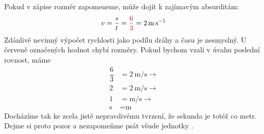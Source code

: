\begin{mdframed}[style=mdexam]
  \begin{example}\label{fyz:exam023}
    Pokud v zápise rozměr zapomeneme, může dojít k zajímavým absurditám:
    \begin{equation*}
      v = \dfrac{s}{t} = \textcolor{red}{\dfrac{6}{3}} = \SI{2}{\m\per\s}
    \end{equation*}
    Zdánlivě nevinný výpočet rychlosti jako podílu dráhy a času je nesmyslný. U červeně označených
    hodnot chybí rozměry. Pokud bychom vzali v úvahu poslední rovnost, máme
    \begin{align*}
      \dfrac{6}{3} &= \SI{2}{\m\per\s}  \rightarrow \\
                 2 &= \SI{2}{\m\per\s}  \rightarrow \\
                 1 &= \si{\m\per\s}     \rightarrow \\
         \si{\s} &= \si{\m} 
    \end{align*}
    Docházíme tak ke zcela jistě nepravdivému tvrzení, že sekunda je totéž co metr. Dejme si proto
    pozor a nezapomeňme psát všude jednotky \cite[s.~1]{Kulhanek2020}. 
  \end{example}
\end{mdframed}